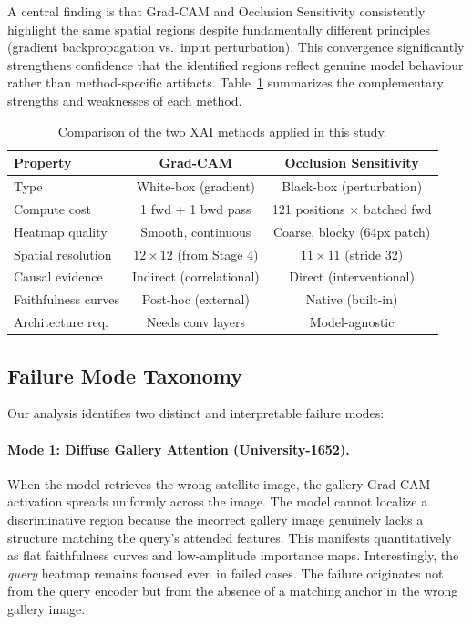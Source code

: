 \documentclass{article}
\begin{document}
A central finding is that Grad-CAM and Occlusion Sensitivity consistently highlight the same spatial regions despite fundamentally different principles (gradient backpropagation vs.\ input perturbation).
This convergence significantly strengthens confidence that the identified regions reflect genuine model behaviour rather than method-specific artifacts.
Table~\ref{tab:method_comparison} summarizes the complementary strengths and weaknesses of each method.

\begin{table}[h]
\caption{Comparison of the two XAI methods applied in this study.}
\label{tab:method_comparison}
\centering
\small
\begin{tabular}{lcc}
\toprule
\textbf{Property} & \textbf{Grad-CAM} & \textbf{Occlusion Sensitivity} \\
\midrule
Type & White-box (gradient) & Black-box (perturbation) \\
Compute cost & 1 fwd + 1 bwd pass & 121 positions $\times$ batched fwd \\
Heatmap quality & Smooth, continuous & Coarse, blocky (64px patch) \\
Spatial resolution & $12\times12$ (from Stage 4) & $11\times11$ (stride 32) \\
Causal evidence & Indirect (correlational) & Direct (interventional) \\
Faithfulness curves & Post-hoc (external) & Native (built-in) \\
Architecture req. & Needs conv layers & Model-agnostic \\
\bottomrule
\end{tabular}
\end{table}

\subsection{Failure Mode Taxonomy}

Our analysis identifies two distinct and interpretable failure modes:

\paragraph{Mode 1: Diffuse Gallery Attention (University-1652).}
When the model retrieves the wrong satellite image, the gallery Grad-CAM activation spreads uniformly across the image.
The model cannot localize a discriminative region because the incorrect gallery image genuinely lacks a structure matching the query's attended features.
This manifests quantitatively as flat faithfulness curves and low-amplitude importance maps.
Interestingly, the \emph{query} heatmap remains focused even in failed cases. The failure originates not from the query encoder but from the absence of a matching anchor in the wrong gallery image.
\end{document}
